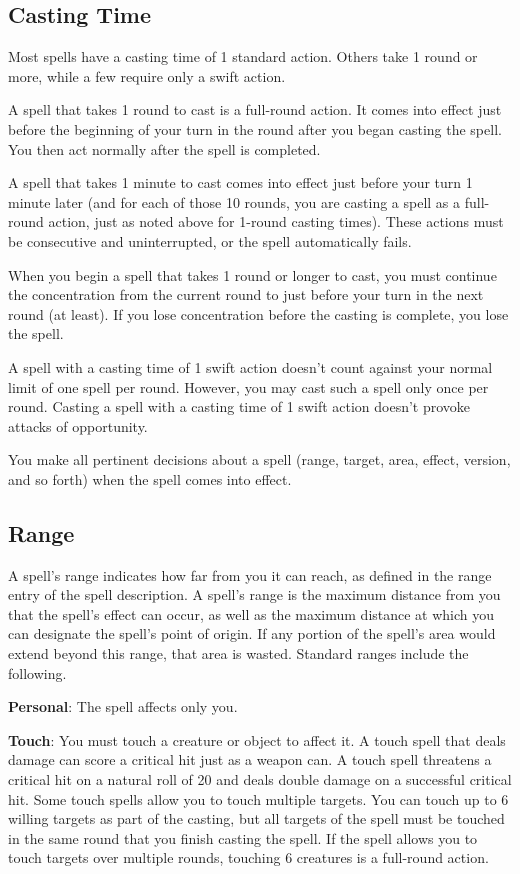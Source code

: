 \subsection{Casting Time}

				
Most spells have a casting time of 1 standard action. Others take 1 round or more, while a few require only a swift action.
				
A spell that takes 1 round to cast is a full-round action. It comes into effect just before the beginning of your turn in the round after you began casting the spell. You then act normally after the spell is completed.
				
A spell that takes 1 minute to cast comes into effect just before your turn 1 minute later (and for each of those 10 rounds, you are casting a spell as a full-round action, just as noted above for 1-round casting times). These actions must be consecutive and uninterrupted, or the spell automatically fails.
				
When you begin a spell that takes 1 round or longer to cast, you must continue the concentration from the current round to just before your turn in the next round (at least). If you lose concentration before the casting is complete, you lose the spell.
				
A spell with a casting time of 1 swift action doesn't count against your normal limit of one spell per round. However, you may cast such a spell only once per round. Casting a spell with a casting time of 1 swift action doesn't provoke attacks of opportunity.
				
You make all pertinent decisions about a spell (range, target, area, effect, version, and so forth) when the spell comes into effect.
				
\subsection{Range}

				
A spell's range indicates how far from you it can reach, as defined in the range entry of the spell description. A spell's range is the maximum distance from you that the spell's effect can occur, as well as the maximum distance at which you can designate the spell's point of origin. If any portion of the spell's area would extend beyond this range, that area is wasted. Standard ranges include the following.
				
\textbf{Personal}: The spell affects only you.
				
\textbf{Touch}: You must touch a creature or object to affect it. A touch spell that deals damage can score a critical hit just as a weapon can. A touch spell threatens a critical hit on a natural roll of 20 and deals double damage on a successful critical hit. Some touch spells allow you to touch multiple targets. You can touch up to 6 willing targets as part of the casting, but all targets of the spell must be touched in the same round that you finish casting the spell. If the spell allows you to touch targets over multiple rounds, touching 6 creatures is a full-round action.
				
